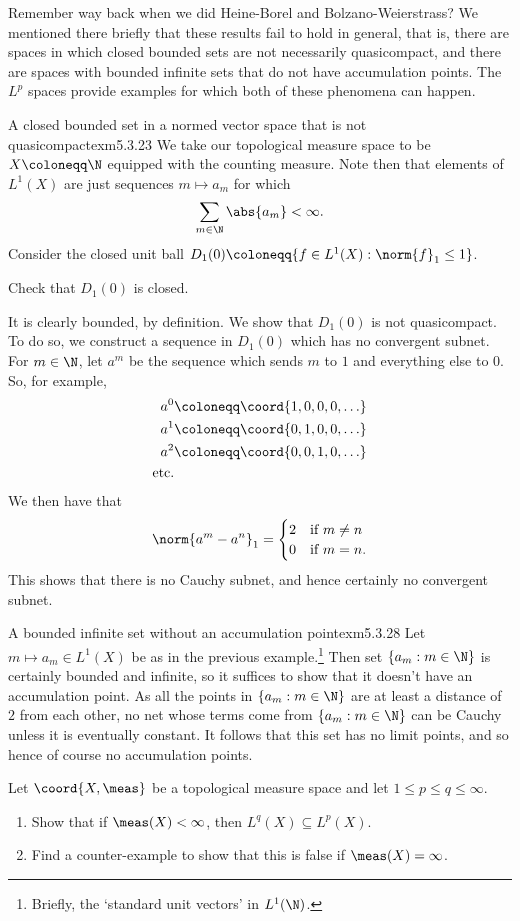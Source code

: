 Remember way back when we did Heine-Borel and Bolzano-Weierstrass?  We mentioned there briefly that these results fail to hold in general, that is, there are spaces in which closed bounded sets are not necessarily quasicompact, and there are spaces with bounded infinite sets that do not have accumulation points.  The $L^p$ spaces provide examples for which both of these phenomena can happen.
\begin{exm}{A closed bounded set in a normed vector space that is not quasicompact}{exm5.3.23}
We take our topological measure space to be $X\coloneqq \N$ equipped with the counting measure.  Note then that elements of $L^1(X)$ are just sequences $m\mapsto a_m$ for which
\begin{equation}
\sum _{m\in \N}\abs{a_m}<\infty .
\end{equation}
Consider the closed unit ball $D_1(0)\coloneqq \{ f\in L^1(X):\norm{f}_1\leq 1\}$.
\begin{exr}[breakable=false]{}{}
Check that $D_1(0)$ is closed.
\end{exr}
It is clearly bounded, by definition.  We show that $D_1(0)$ is not quasicompact.  To do so, we construct a sequence in $D_1(0)$ which has no convergent subnet.  For $m\in \N$, let $a^m$ be the sequence which sends $m$ to $1$ and everything else to $0$.  So, for example,
\begin{equation}
\begin{aligned}
a^0 & \coloneqq \coord{1,0,0,0,\ldots} \\
a^1 & \coloneqq \coord{0,1,0,0,\ldots} \\
a^2 & \coloneqq \coord{0,0,1,0,\ldots} \\
\text{etc.} &
\end{aligned}
\end{equation}
We then have that
\begin{equation}
\norm{a^m-a^n}_1=\begin{cases}2 & \text{if }m\neq n \\ 0 & \text{if }m=n.\end{cases}
\end{equation}
This shows that there is no Cauchy subnet, and hence certainly no convergent subnet.
\end{exm}
\begin{exm}{A bounded infinite set without an accumulation point}{exm5.3.28}
Let $m\mapsto a_m\in L^1(X)$ be as in the previous example.\footnote{Briefly, the `standard unit vectors' in $L^1(\N )$.}  Then set $\{ a_m:m\in \N \}$ is certainly bounded and infinite, so it suffices to show that it doesn't have an accumulation point.  As all the points in $\{ a_m:m\in \N \}$ are at least a distance of $2$ from each other, no net whose terms come from $\{ a_m:m\in \N \}$ can be Cauchy unless it is eventually constant.  It follows that this set has no limit points, and so hence of course no accumulation points.
\end{exm}

\begin{exr}{}{}
Let $\coord{X,\meas}$ be a topological measure space and let $1\leq p\leq q\leq \infty$.
\begin{enumerate}
\item Show that if $\meas (X)<\infty$, then $L^q(X)\subseteq L^p(X)$.
\item Find a counter-example to show that this is false if $\meas (X)=\infty$.
\end{enumerate}
\end{exr}